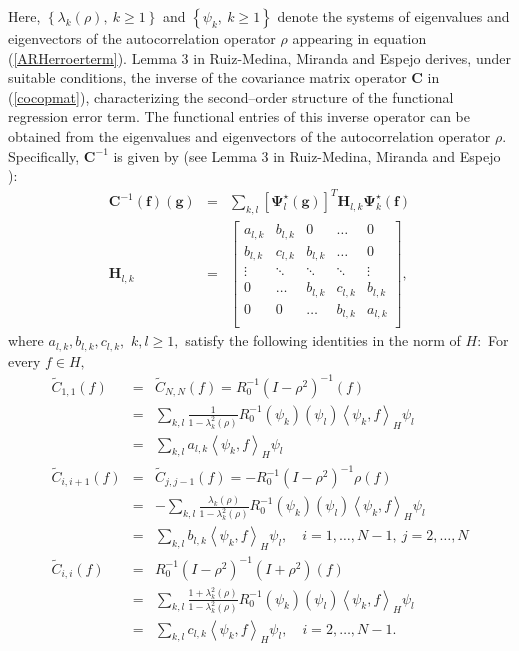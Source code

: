 \documentclass[11pt,a4paper]{article}
\begin{document}
Here,  $\left\{\lambda_{k}(\rho),\ k\geq 1\right\}$ and $\left\{ \psi_{k},\ k\geq 1\right\}$ denote the systems of eigenvalues and eigenvectors of the autocorrelation operator $\rho$ appearing in equation (\ref{ARHerroerterm}).
Lemma 3 in Ruiz-Medina,  Miranda and  Espejo \cite{RuizMedinaMirandaEspejo19} derives, under suitable conditions, the inverse of the covariance matrix operator  $\mathbf{C}$ in  (\ref{cocopmat}), characterizing the second--order structure of the functional  regression error term. The functional entries of this inverse operator  can be obtained from the eigenvalues and eigenvectors of the autocorrelation operator $\rho.$  Specifically,  $\mathbf{C}^{-1}$ is given  by  (see Lemma 3 in  Ruiz-Medina,  Miranda and  Espejo \cite{RuizMedinaMirandaEspejo19}):
\begin{eqnarray}
\mathbf{C}^{-1}(\mathbf{f})(\mathbf{g}) &=& \sum_{k,l}[\boldsymbol{\Psi}_{l}^{\star}(\mathbf{g})]^{T}
\mathbf{H}_{l,k}\boldsymbol{\Psi}_{k}^{\star}
(\mathbf{f})\label{eqmcoCinv}\\
\mathbf{H}_{l,k}&=&\left[\begin{array}{ccccc} a_{l,k} & b_{l,k}  & 0 & \ldots   & 0  \\
b_{l,k}  &   c_{l,k} &  b_{l,k}&  \ldots  &  0 \\
 \vdots & \ddots &  \ddots  & \ddots & \vdots\\
 0& \ldots  & b_{l,k} &   c_{l,k} & b_{l,k} \\
0 &0 &  \ldots &   b_{l,k}  &
a_{l,k}\\
 \end{array}\right],\label{sdcinvcoo}
\end{eqnarray}
\noindent where $a_{l,k},b_{l,k},c_{l,k},$ $k,l\geq 1,$  satisfy the following identities in the norm of $H:$ For every $f\in H,$
\begin{eqnarray}
\widetilde{C}_{1,1}(f)&=&\widetilde{C}_{N,N}(f)= R_{0}^{-1}(I-\rho^{2})^{-1}(f)
\nonumber\\
&=& \sum_{k,l}
 \frac{1}{1-\lambda_{k}^{2}(\rho)}R_{0}^{-1}(\psi_{k})(\psi_{l})\left\langle \psi_{k},f\right\rangle_{H}\psi_{l}\nonumber\\
 &=& \sum_{k,l}a_{l,k}\left\langle \psi_{k},f\right\rangle_{H}\psi_{l}\nonumber\\
\widetilde{C}_{i,i+1}(f)&=&\widetilde{C}_{j,j-1}(f)= -R_{0}^{-1}(I-\rho^{2})^{-1}\rho (f)
\nonumber\\
&=& -\sum_{k,l}\frac{\lambda_{k}(\rho)}{1-\lambda_{k}^{2}(\rho)}
 R_{0}^{-1}(\psi_{k})(\psi_{l})\left\langle \psi_{k},f\right\rangle_{H}\psi_{l}\nonumber\\
 &=& \sum_{k,l}b_{l,k}\left\langle \psi_{k},f\right\rangle_{H}\psi_{l} ,\quad i=1,\dots, N-1,
\ j=2,\dots, N\nonumber\\
\widetilde{C}_{i,i}(f)&=& R_{0}^{-1}(I-\rho^{2})^{-1}(I+\rho^{2})(f)
\nonumber\\
 &=&\sum_{k,l}
 \frac{1+\lambda_{k}^{2}(\rho)}{1-\lambda_{k}^{2}(\rho)}
 R_{0}^{-1}(\psi_{k})(\psi_{l})
  \left\langle \psi_{k},f\right\rangle_{H}\psi_{l}\nonumber\\
 &=& \sum_{k,l}c_{l,k}\left\langle \psi_{k},f\right\rangle_{H}\psi_{l},\quad i=2,\dots, N-1.
   \label{sefecinh}
 \end{eqnarray}
\end{document}
